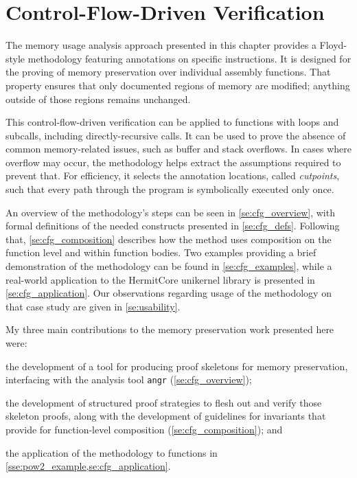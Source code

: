 \chapter{Control-Flow-Driven Verification}\label{ch:cfg}
The memory usage analysis approach presented in this chapter
provides a Floyd-style methodology featuring annotations on specific instructions.
It is designed for the proving of memory preservation%
over individual assembly functions.
That property ensures that only documented regions of memory are modified;%
anything outside of those regions remains unchanged.

This control-flow-driven verification
can be applied to functions with loops and subcalls,
including directly-recursive calls.
It can be used to prove the absence of common memory-related issues,
such as buffer and stack overflows. In cases where overflow may occur,
the methodology helps extract the assumptions required to prevent that.
For efficiency, it selects the annotation locations,
called \emph{cutpoints},%
such that every path through the program
is symbolically executed only once.%

An overview of the methodology's steps can be seen in \cref{se:cfg_overview},
with formal definitions of the needed constructs presented in \cref{se:cfg_defs}.
Following that, \cref{se:cfg_composition} describes how the method uses composition
on the function level and within function bodies.
Two examples providing a brief demonstration of the methodology
can be found in \cref{se:cfg_examples}, while a real-world application
to the HermitCore unikernel library \autocite{lankes2016hermitcore}
is presented in \cref{se:cfg_application}.
Our observations regarding usage of the methodology on that case study
are given in \cref{se:usability}.

My three main contributions to the memory preservation work presented here were:
\begin{enumerate*}
  \item the development of a tool for producing proof skeletons
  for memory preservation, interfacing with the analysis tool
  \texttt{angr} (\cref{se:cfg_overview});
  \item the development of structured proof strategies
  to flesh out and verify those skeleton proofs,
  along with the development of guidelines
  for invariants that provide for
  function-level composition (\cref{se:cfg_composition});
  and
  \item the application of the methodology to functions in
  \cref{sse:pow2_example,se:cfg_application}.
\end{enumerate*}

